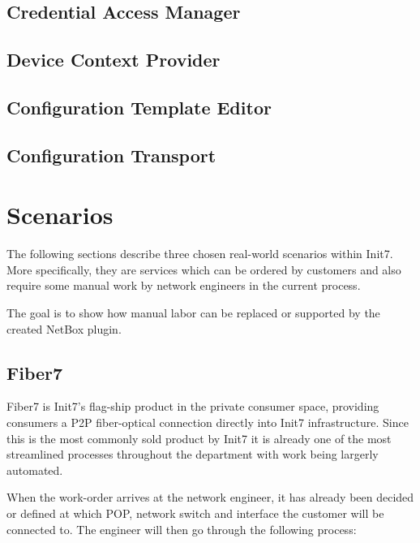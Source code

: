 \subsection{Credential Access Manager}



\subsection{Device Context Provider}

\subsection{Configuration Template Editor}

\subsection{Configuration Transport}



\section{Scenarios}

The following sections describe three chosen real-world scenarios within Init7.
More specifically, they are services which can be ordered by customers and also
require some manual work by network engineers in the current process.

The goal is to show how manual labor can be replaced or supported by the
created NetBox plugin.

\subsection{Fiber7}

Fiber7 is Init7's flag-ship product in the private consumer space,
providing consumers a \acrshort{P2P} fiber-optical connection directly into
Init7 infrastructure. Since this is the most commonly sold product by Init7
it is already one of the most streamlined processes throughout the department
with work being largerly automated.


When the work-order arrives at the network engineer, it has already been decided
or defined at which \acrshort{POP}, network switch and interface the customer
will be connected to. The engineer will then go through the following process:

